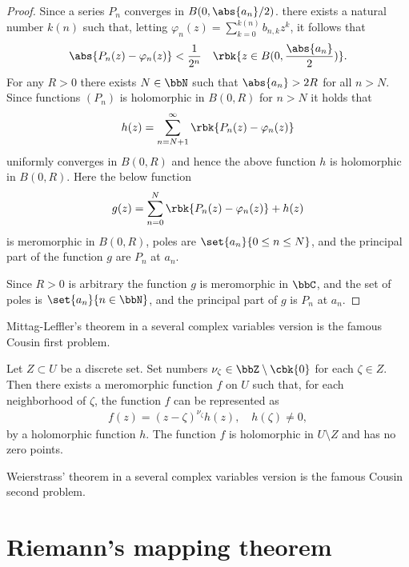 \documentclass[openany, a4paper, oneside]{jsbook}
\begin{document}
\begin{proof}
Since a series $P_n$ converges in $B (0, \abs{a_n} / 2)$.
there exists a natural number $k (n)$ such that, letting $\varphi_n (z) = \sum_{k=0}^{k (n)} b_{n, k}z^k$, it follows that
\begin{align}
 \abs{P_n (z) - \varphi_n (z)}  < \frac{1}{2^n} \quad \rbk{z \in B (0, \frac{\abs{a_n}}{2})}.
\end{align}
For any $R>0$ there exists $N \in \bbN$ such that $\abs{a_n} > 2R$ for all $n > N$.
Since functions $(P_n)$ is holomorphic in $B (0,R)$ for $n > N$ it holds that
\begin{align}
 h (z)
 =
 \sum_{n = N + 1}^{\infty} \rbk{P_n (z) - \varphi_n (z)}
\end{align}
uniformly converges in $B (0, R)$ and hence the above function $h$ is holomorphic in $B (0, R)$.
Here the below function
\begin{align}
 g (z)
 =
 \sum_{n=0}^N \rbk{P_n (z) - \varphi_n (z)} + h (z)
\end{align}
is meromorphic in $B (0, R)$, poles are $\set{a_n}{0 \leq n \leq N}$,
and the principal part of the function $g$ are $P_n$ at $a_n$.

Since $R > 0$ is arbitrary the function $g$ is meromorphic in $\bbC$,
and the set of poles is $\set{a_n}{n \in \bbN}$,
and the principal part of $g$ is $P_n$ at $a_n$.
\end{proof}
\begin{rem}
 Mittag-Leffler's theorem in a several complex variables version is the famous Cousin first problem.
\end{rem}

\begin{thm}
 Let $Z \subset U$ be a discrete set.
 Set numbers $\nu_{\zeta} \in \bbZ \setminus \cbk{0}$ for each $\zeta \in Z$.
 Then there exists a meromorphic function $f$ on $U$ such that, for each neighborhood of $\zeta$,
 the function $f$ can be represented as
 \begin{align}
  f (z)
  =
  (z - \zeta)^{\nu_{\zeta}} h (z), \quad h (\zeta) \neq 0,
 \end{align}
 by a holomorphic function $h$.
 The function $f$ is holomorphic in $U \setminus Z$ and has no zero points.
\end{thm}
\begin{rem}
 Weierstrass' theorem in a several complex variables version is the famous Cousin second problem.
\end{rem}
\section{Riemann's mapping theorem}
\end{document}
